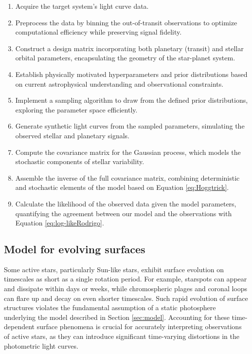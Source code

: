 \documentclass[twocolumn]{aastex631}
\begin{document}
\begin{enumerate}
    \item Acquire the target system's light curve data.
    \item Preprocess the data by binning the out-of-transit observations to optimize computational efficiency while preserving signal fidelity.
    \item Construct a design matrix incorporating both planetary (transit) and stellar orbital parameters, encapsulating the geometry of the star-planet system.
    \item Establish physically motivated hyperparameters and prior distributions based on current astrophysical understanding and observational constraints.
    \item Implement a sampling algorithm to draw from the defined prior distributions, exploring the parameter space efficiently.
    \item Generate synthetic light curves from the sampled parameters, simulating the observed stellar and planetary signals.
    \item Compute the covariance matrix for the Gaussian process, which models the stochastic components of stellar variability.
    \item Assemble the inverse of the full covariance matrix, combining deterministic and stochastic elements of the model based on Equation \ref{eq:Hoggtrick}.
    \item Calculate the likelihood of the observed data given the model parameters, quantifying the agreement between our model and the observations with Equation \ref{eq:log-likeRodrigo}.
\end{enumerate}

\subsection{Model for evolving surfaces}
\label{sec:evolmodel}
Some active stars, particularly Sun-like stars, exhibit surface evolution on timescales as short as a single rotation period. For example, starspots can appear and dissipate within days or weeks, 
while chromospheric plages and coronal loops can flare up and decay on even shorter timescales. Such rapid evolution of surface structures violates 
the fundamental assumption of a static photosphere underlying the model described in Section \ref{sec:model}. 
Accounting for these time-dependent surface phenomena is crucial for accurately interpreting observations of active stars, as they can introduce significant 
time-varying distortions in the photometric light curves. 
\end{document}
